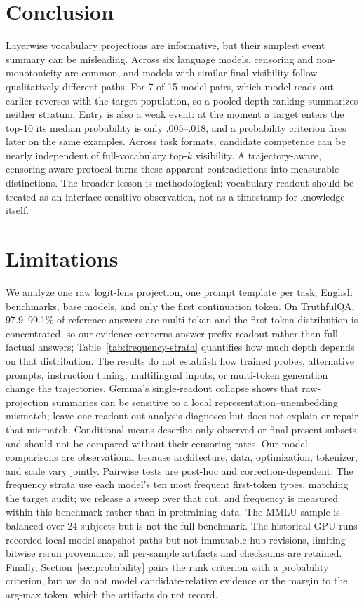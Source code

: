 \documentclass[11pt]{article}
\begin{document}
\section{Conclusion}
Layerwise vocabulary projections are informative, but their simplest event summary can be misleading. Across six language models, censoring and non-monotonicity are common, and models with similar final visibility follow qualitatively different paths. For 7 of 15 model pairs, which model reads out earlier reverses with the target population, so a pooled depth ranking summarizes neither stratum. Entry is also a weak event: at the moment a target enters the top-10 its median probability is only .005--.018, and a probability criterion fires later on the same examples. Across task formats, candidate competence can be nearly independent of full-vocabulary top-$k$ visibility. A trajectory-aware, censoring-aware protocol turns these apparent contradictions into measurable distinctions. The broader lesson is methodological: vocabulary readout should be treated as an interface-sensitive observation, not as a timestamp for knowledge itself.

\section*{Limitations}
We analyze one raw logit-lens projection, one prompt template per task, English benchmarks, base models, and only the first continuation token. On TruthfulQA, 97.9--99.1\% of reference answers are multi-token and the first-token distribution is concentrated, so our evidence concerns answer-prefix readout rather than full factual answers; Table~\ref{tab:frequency-strata} quantifies how much depth depends on that distribution. The results do not establish how trained probes, alternative prompts, instruction tuning, multilingual inputs, or multi-token generation change the trajectories. Gemma's single-readout collapse shows that raw-projection summaries can be sensitive to a local representation--unembedding mismatch; leave-one-readout-out analysis diagnoses but does not explain or repair that mismatch. Conditional means describe only observed or final-present subsets and should not be compared without their censoring rates. Our model comparisons are observational because architecture, data, optimization, tokenizer, and scale vary jointly. Pairwise tests are post-hoc and correction-dependent. The frequency strata use each model's ten most frequent first-token types, matching the target audit; we release a sweep over that cut, and frequency is measured within this benchmark rather than in pretraining data. The MMLU sample is balanced over 24 subjects but is not the full benchmark. The historical GPU runs recorded local model snapshot paths but not immutable hub revisions, limiting bitwise rerun provenance; all per-sample artifacts and checksums are retained. Finally, Section~\ref{sec:probability} pairs the rank criterion with a probability criterion, but we do not model candidate-relative evidence or the margin to the arg-max token, which the artifacts do not record.
\end{document}
